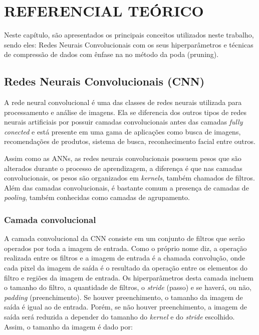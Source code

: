 \chapter[Referencial Teórico]{REFERENCIAL TEÓRICO}
\label{ch:cap2}


Neste capítulo, são apresentados os principais conceitos utilizados neste trabalho, sendo eles: Redes Neurais Convolucionais com os seus hiperparâmetros e técnicas de compressão de dados com ênfase na no método da poda (pruning).


\section{Redes Neurais Convolucionais (CNN)} \label{secao1}
A rede neural convolucional é uma das classes de redes neurais utilizada para processamento e análise de imagens. Ela se diferencia dos outros tipos de redes neurais artificiais por possuir camadas convolucionais antes das camadas \textit{fully conected} e está presente em uma gama de aplicações como busca de imagens, recomendações de produtos, sistema de busca, reconhecimento facial entre outros. 

Assim como as ANNs, as redes neurais convolucionais possuem pesos que são alterados durante o processo de aprendizagem, a diferença é que nas camadas convolucionais, os pesos são organizados em \textit{kernels}, também chamados de filtros. Além das camadas convolucionais, é bastante comum a presença de camadas de \textit{pooling}, também conhecidas como camadas de agrupamento.

\subsection{Camada convolucional}
A camada convolucional da CNN consiste em um conjunto de filtros que serão operados por toda a imagem de entrada. Como o próprio nome diz, a operação realizada entre os filtros e a imagem de entrada é a chamada convolução, onde cada pixel da imagem de saída é o resultado da operação entre os elementos do filtro e regiões da imagem de entrada. Os hiperparâmetros desta camada incluem o tamanho do filtro, a quantidade de filtros, o \textit{stride} (passo) e se haverá, ou não, \textit{padding} (preenchimento). Se houver preenchimento, o tamanho da imagem de saída é igual ao de entrada. Porém, se não houver preenchimento, a imagem de saída será reduzida a depender do tamanho do \textit{kernel} e do \textit{stride} escolhido. Assim, o tamanho da imagem é dado por:

